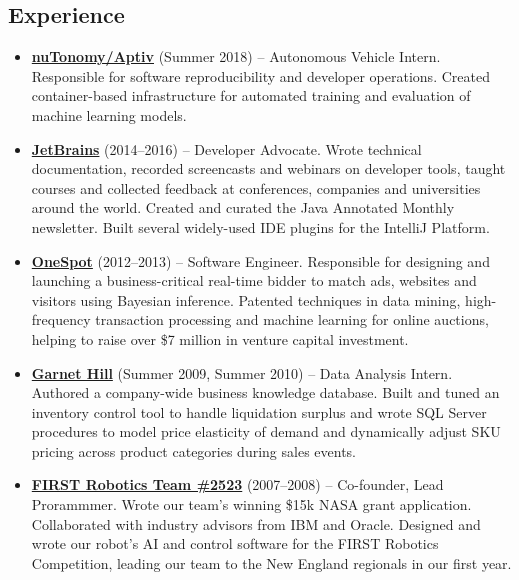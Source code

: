 \documentclass[letterpaper,11pt]{article}
\newcommand{\resumeItem}[2]{
\item\small{
\textbf{#1}{ #2 \vspace{-2pt}}
}
}
\newcommand{\resumeSubItem}[2]{\resumeItem{#1}{#2}}
\newcommand{\resumeSubHeadingListStart}{\begin{itemize}[leftmargin=*]}
\newcommand{\resumeSubHeadingListEnd}{\end{itemize}}
\begin{document}
\begin{justify}
\section{Experience}
\resumeSubHeadingListStart
\resumeSubItem{\href{https://www.aptiv.com/}{nuTonomy/Aptiv}}{(Summer 2018) -- Autonomous Vehicle Intern. Responsible for software reproducibility and developer operations. Created container-based infrastructure for automated training and evaluation of machine learning models.}
\resumeSubItem{\href{https://www.jetbrains.com/}{JetBrains}}{(2014--2016) -- Developer Advocate. Wrote technical documentation, recorded screencasts and webinars on developer tools, taught courses and collected feedback at conferences, companies and universities around the world. Created and curated the Java Annotated Monthly newsletter. Built several widely-used IDE plugins for the IntelliJ Platform.}
\resumeSubItem{\href{https://www.onespot.com/}{OneSpot}}{(2012--2013) -- Software Engineer. Responsible for designing and launching a business-critical real-time bidder to match ads, websites and visitors using Bayesian inference. Patented techniques in data mining, high-frequency transaction processing and machine learning for online auctions, helping to raise over \$7 million in venture capital investment.}
\resumeSubItem{\href{https://www.garnethill.com/}{Garnet Hill}}{(Summer 2009, Summer 2010) -- Data Analysis Intern. Authored a company-wide business knowledge database. Built and tuned an inventory control tool to handle liquidation surplus and wrote SQL Server procedures to model price elasticity of demand and dynamically adjust SKU pricing across product categories during sales events.}
\resumeSubItem{\href{https://www.firstinspires.org/}{FIRST Robotics Team \#2523}}{(2007--2008) -- Co-founder, Lead Prorammmer. Wrote our team's winning \$15k NASA grant application. Collaborated with industry advisors from IBM and Oracle. Designed and wrote our robot's AI and control software for the FIRST Robotics Competition, leading our team to the New England regionals in our first year.}
\resumeSubHeadingListEnd



\end{justify}
\end{document}
